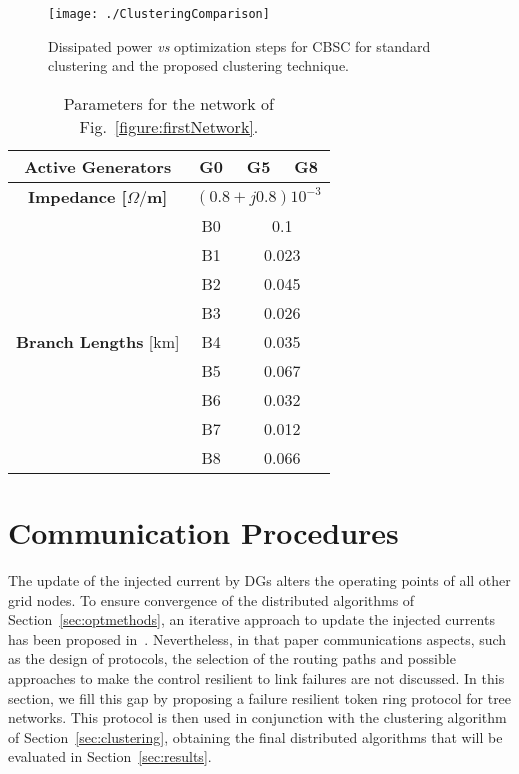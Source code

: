 \documentclass[journal]{IEEEtran}
\newcommand{\fig}[1]{Fig.~\ref{#1}}
\newcommand{\secref}[1]{Section~\ref{#1}}
\begin{document}
\begin{figure}
\centering
\texttt{[image: ./ClusteringComparison]}
\caption{Dissipated power {\it vs} optimization steps for CBSC for standard clustering and the proposed clustering technique.}\label{figure:compCluster}
\end{figure}

\begin{table}[ht]
\caption{Parameters for the network of \fig{figure:firstNetwork}.}
\centering
\begin{tabular}{|c|ccc|}
\hline
\textbf{Active Generators} & G0 & G5 & G8\\
\hline
\textbf{Impedance [$\Omega/$m]} & \multicolumn{3}{c|}{$(0.8+j0.8)10^{-3}$}\\
\hline
\multirow{9}{*}{\textbf{Branch Lengths} [km]}
&B0&\multicolumn{2}{|c|}{0.1}\\
\cline{2-4}
&B1&\multicolumn{2}{|c|}{0.023}\\
\cline{2-4}
&B2&\multicolumn{2}{|c|}{0.045}\\
\cline{2-4}
&B3&\multicolumn{2}{|c|}{0.026}\\
\cline{2-4}
&B4&\multicolumn{2}{|c|}{0.035}\\
\cline{2-4}
&B5&\multicolumn{2}{|c|}{0.067}\\
\cline{2-4}
&B6&\multicolumn{2}{|c|}{0.032}\\
\cline{2-4}
&B7&\multicolumn{2}{|c|}{0.012}\\
\cline{2-4}
&B8&\multicolumn{2}{|c|}{0.066}\\
\hline
\end{tabular}
\label{table:clusterParamsTable}
\end{table}



\section{Communication Procedures}
\label{sec:commproc}

The update of the injected current by DGs alters the operating points of all other grid nodes. To ensure convergence of the distributed algorithms of \secref{sec:optmethods}, an iterative approach to update the injected currents has been proposed in~\cite{SurroundControl}. Nevertheless, in that paper communications aspects, such as the design of protocols, the selection of the routing paths and possible approaches to make the control resilient to link failures are not discussed. In this section, we fill this gap by proposing a failure resilient token ring protocol for tree networks. This protocol is then used in conjunction with the clustering algorithm of \secref{sec:clustering}, obtaining the final distributed algorithms that will be evaluated in \secref{sec:results}.
\end{document}
